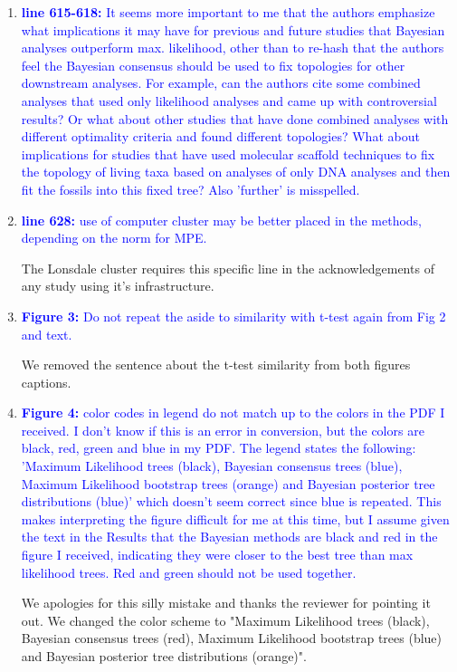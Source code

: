 \documentclass[12pt,letterpaper]{article}
\begin{document}
\begin{enumerate}
\item{\textcolor{blue}{\textbf{line 615-618:} It seems more important to me that the authors emphasize what implications it may have for previous and future studies that Bayesian analyses outperform max. likelihood, other than to re-hash that the authors feel the Bayesian consensus should be used to fix topologies for other downstream analyses. For example, can the authors cite some combined analyses that used only likelihood analyses and came up with controversial results? Or what about other studies that have done combined analyses with different optimality criteria and found different topologies? What about implications for studies that have used molecular scaffold techniques to fix the topology of living taxa based on analyses of only DNA analyses and then fit the fossils into this fixed tree? Also 'further' is misspelled.  }}


\item{\textcolor{blue}{\textbf{line 628:} use of computer cluster may be better placed in the methods, depending on the norm for MPE.}}

The Lonsdale cluster requires this specific line in the acknowledgements of any study using it's infrastructure.

\item{\textcolor{blue}{\textbf{Figure 3:} Do not repeat the aside to similarity with t-test again from Fig 2 and text.}}

We removed the sentence about the t-test similarity from both figures captions. %

\item{\textcolor{blue}{\textbf{Figure 4:} color codes in legend do not match up to the colors in the PDF I received. I don't know if this is an error in conversion, but the colors are black, red, green and blue in my PDF. The legend states the following: 'Maximum Likelihood trees (black), Bayesian consensus trees (blue), Maximum Likelihood bootstrap trees (orange) and Bayesian posterior tree distributions (blue)' which doesn't seem correct since blue is repeated. This makes interpreting the figure difficult for me at this time, but I assume given the text in the Results that the Bayesian methods are black and red in the figure I received, indicating they were closer to the best tree than max likelihood trees. Red and green should not be used together.}}

We apologies for this silly mistake and thanks the reviewer for pointing it out. We changed the color scheme to "Maximum Likelihood trees (black), Bayesian consensus trees (red), Maximum Likelihood bootstrap trees (blue) and Bayesian posterior tree distributions (orange)".


\end{enumerate}
\end{document}

